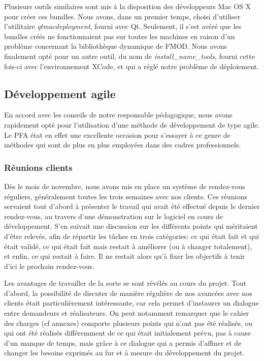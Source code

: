 \documentclass[a4paper,11pt]{article}
\begin{document}
Plusieurs outils similaires sont mis à la disposition des développeurs Mac OS X pour créer ces bundles. Nous avons, dans un premier temps, choisi d'utiliser l'utilitaire \textit{qtmacdeployment}, fourni avec Qt. Seulement, il s'est avéré que les bundles créés ne fonctionnaient pas sur toutes les machines en raison d'un problème concernant la bibliothèque dynamique de FMOD. Nous avons finalement opté pour un autre outil, du nom de \textit{install\_name\_tools}, fourni cette fois-ci avec l'environnement XCode, et qui a réglé notre problème de déploiement.

\subsection{Développement agile}

En accord avec les conseils de notre responsable pédagogique, nous avons rapidement opté pour l'utilisation d'une méthode de développement de type agile. Le PFA état en effet une excellente occasion pour s'essayer à ce genre de méthodes qui sont de plus en plus employées dans des cadres professionnels. 

\subsubsection{Réunions clients}

Dès le mois de novembre, nous avons mis en place un système de rendez-vous réguliers, généralement toutes les trois semaines avec nos clients. Ces réunions servaient tout d'abord à présenter le travail qui avait été effectué depuis le dernier rendez-vous, au travers d'une démonstration sur le logiciel en cours de développement. S'en suivait une discussion sur les différents points qui méritaient d'être relevés, afin de répartir les tâches en trois catégories: ce qui était fait et qui était validé, ce qui était fait mais restait à améliorer (ou à changer totalement), et enfin, ce qui restait à faire. Il ne restait alors qu'à fixer les objectifs à tenir d'ici le prochain rendez-vous.

Les avantages de travailler de la sorte se sont révélés au cours du projet. Tout d'abord, la possibilité de discuter de manière régulière de nos avancées avec nos clients était particulièrement intéressante, car cela permet d'instaurer un dialogue entre demandeurs et réalisateurs. On peut notamment remarquer que le cahier des charges (cf annexes) comporte plusieurs points qui n'ont pas été réalisés, ou qui ont été réalisés différemment de ce qui était initialement prévu, pas à cause d'un manque de temps, mais grâce à ce dialogue qui a permis d'affiner et de changer les besoins exprimés au fur et à mesure du développement du projet.
\end{document}
